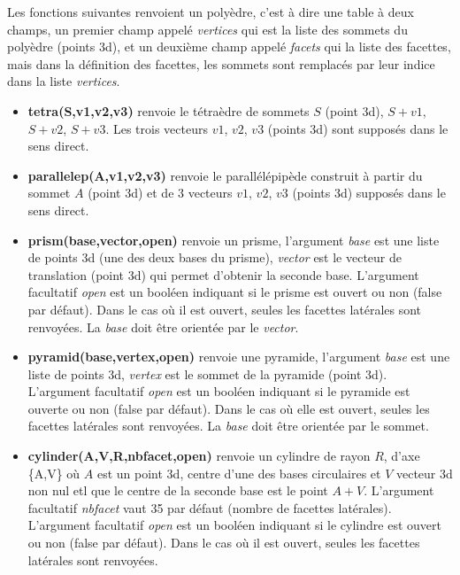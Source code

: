 Les fonctions suivantes renvoient un polyèdre, c'est à dire une table à deux champs, un premier champ appelé \emph{vertices} qui est la liste des sommets du polyèdre (points 3d), et un deuxième champ appelé \emph{facets} qui la liste des facettes, mais dans la définition des facettes, les sommets sont remplacés par leur indice dans la liste \emph{vertices}.

\begin{itemize}
    \item \textbf{tetra(S,v1,v2,v3)} renvoie le tétraèdre de sommets $S$ (point 3d), $S+v1$, $S+v2$, $S+v3$. Les trois vecteurs $v1$, $v2$, $v3$ (points 3d) sont supposés dans le sens direct.
    
    \item \textbf{parallelep(A,v1,v2,v3)} renvoie le parallélépipède construit à partir du sommet $A$ (point 3d) et de 3 vecteurs $v1$, $v2$, $v3$ (points 3d) supposés dans le sens direct.
    
    \item \textbf{prism(base,vector,open)} renvoie un prisme, l'argument \emph{base} est une liste de points 3d (une des deux bases du prisme), \emph{vector} est le vecteur de translation (point 3d) qui permet d'obtenir la seconde base. L'argument facultatif \emph{open} est un booléen indiquant si le prisme est ouvert ou non (false par défaut). Dans le cas où il est ouvert, seules les facettes latérales sont renvoyées. La \emph{base} doit être orientée par le \emph{vector}.
    
    \item \textbf{pyramid(base,vertex,open)} renvoie une pyramide, l'argument \emph{base} est une liste de points 3d, \emph{vertex} est le sommet de la pyramide (point 3d). L'argument facultatif \emph{open} est un booléen indiquant si le pyramide est ouverte ou non (false par défaut). Dans le cas où elle est ouvert, seules les facettes latérales sont renvoyées. La \emph{base} doit être orientée par le sommet.
    
    \item \textbf{cylinder(A,V,R,nbfacet,open)} renvoie un cylindre de rayon $R$, d'axe \{A,V\} où $A$ est un point 3d, centre d'une des bases circulaires et $V$ vecteur 3d non nul etl que le centre de la seconde base est le point $A+V$. L'argument facultatif \emph{nbfacet} vaut 35 par défaut (nombre de facettes latérales). L'argument facultatif \emph{open} est un booléen indiquant si le cylindre est ouvert ou non (false par défaut). Dans le cas où il est ouvert, seules les facettes latérales sont renvoyées.
    

\end{itemize}
